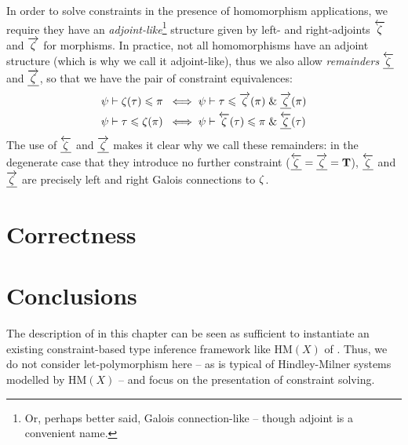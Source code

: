 In order to solve constraints in the presence of homomorphism applications, we require they have an \emph{adjoint-like}\footnote{Or, perhaps better said, Galois connection-like -- though adjoint is a convenient name.} structure given by left- and right-adjoints $\overleftarrow{\zeta}$ and $\overrightarrow{\zeta}$ for morphisms. In practice, not all homomorphisms have an adjoint structure (which is why we call it adjoint-like), thus we also allow \emph{remainders} $\underline{\overleftarrow{\zeta}}$ and $\underline{\overrightarrow{\zeta}}$, so that we have the pair of constraint equivalences:
\begin{align*}
\psi \vdash \zeta(\tau) \leqslant \pi &\;\iff \psi \vdash \tau \leqslant \overrightarrow{\zeta}(\pi) \;\&\; \underline{\overrightarrow{\zeta}}(\pi) \\
\psi \vdash \tau \leqslant \zeta(\pi) &\;\iff \psi \vdash \overleftarrow{\zeta}(\tau) \leqslant \pi \;\&\; \underline{\overleftarrow{\zeta}}(\tau)
\end{align*}
The use of $\underline{\overleftarrow{\zeta}}$ and $\underline{\overrightarrow{\zeta}}$ makes it clear why we call these remainders: in the degenerate case that they introduce no further constraint ($\underline{\overleftarrow{\zeta}} = \underline{\overrightarrow{\zeta}} = \mathbf T$), $\underline{\overleftarrow{\zeta}}$ and $\underline{\overrightarrow{\zeta}}$ are precisely left and right Galois connections to $\zeta$.

\section{Correctness}
\label{sec:correctness}

\section{Conclusions}
\label{sec:conclusions}

The description of \inference{} in this chapter can be seen as sufficient to instantiate an existing constraint-based type inference framework like $\mathrm{HM}(X)$ of \textcite{constraint-based-hm}. Thus, we do not consider let-polymorphism here -- as is typical of Hindley-Milner systems modelled by $\mathrm{HM}(X)$ -- and focus on the presentation of constraint solving.



